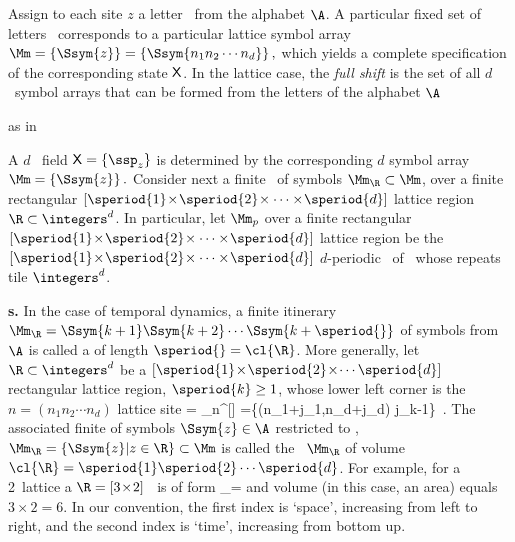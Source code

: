 \bigskip

Assign to each site $z$ a
letter \ from the alphabet $\A$. A particular fixed set
of letters  \ corresponds to a particular lattice symbol array
\(
\Mm= \{\Ssym{z}\} %
 = \{\Ssym{n_1 n_2 \cdots n_d}\}
\,,
\)
which yields a complete specification of the corresponding state $\mathsf{X}$.
In the lattice case, the {\em full shift} is the set of all $d$\dmn\
symbol arrays that can be formed from the letters of the alphabet $\A$

as in 

A $d$\dmn\ {\spt} field
\(
\Xx=\{\ssp_{z}\}
\)
is determined by the corresponding {\em $d$\dmn} {\spt}
symbol array
\(
\Mm=\{\Ssym{z}\}
\,.
\)
Consider next a finite \brick\ of symbols $\Mm_{\R}\subset\Mm$,
over a finite rectangular $[\speriod{1}\!\times\!\speriod{2}\!\times\cdots\times\!\speriod{d}]$
lattice region $\R\subset \integers^d$.
In particular, let $\Mm_{p}$ over a finite rectangular
$[\speriod{1}\!\times\!\speriod{2}\!\times\cdots\times\!\speriod{d}]$ lattice region be the
$[\speriod{1}\!\times\!\speriod{2}\!\times\cdots\times\!\speriod{d}]$ $d$-periodic \brick\ of
\Mm\ whose repeats tile $\integers^d$.

{\bf {\Brick s}.} In the case of temporal dynamics, a finite itinerary
\\
$\Mm_{\R}={\Ssym{k+1}\Ssym{k+2}\cdots\Ssym{k+\speriod{}}}$ of symbols from
$\A$ is called a {\em \brick} of length $\speriod{}=\cl{\R}$. More generally, let
$\R\subset\integers^d$  be a
$[\speriod{1}\!\times\!\speriod{2}\!\times\!\cdots\speriod{d}]$ rectangular lattice region,
$\speriod{k}\geq1$,
whose lower left corner is the $n=(n_{1}n_{2}\cdots{n_{d}})$ lattice site
\beq
  \R = \R_{n}^{[\!\times\!\!\times\!\cdots{}]}
  =\{(n_1+j_1,\cdots n_d+j_d) \mid 0\leq j_k\leq \speriod{k}-1\}
\,.
The associated finite {\brick} of symbols $\Ssym{z}\in\A$ restricted to  \R,
\(
\Mm_{\R}=\{\Ssym{z}| z\in \R \} \subset \Mm
\)
is called the \brick\ $\Mm_{\R}$ of volume
$\cl{\R} = \speriod{1}\speriod{2}\cdots\speriod{d}$. For example, for a 2\dmn\ lattice
a
$\R = [3\!\times\!2]$ \brick\ is of form
\beq
\Mm_{\R}=
and volume (in this case, an area) equals $3\times 2 = 6$.
In our convention, the first index is `space', increasing from left to right,
and the second index is `time', increasing from bottom up.

